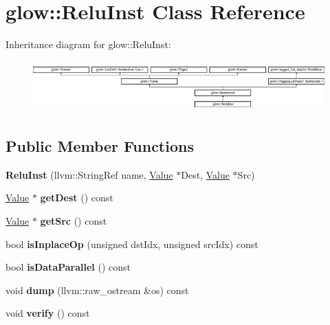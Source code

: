 \hypertarget{classglow_1_1_relu_inst}{}\section{glow\+:\+:Relu\+Inst Class Reference}
\label{classglow_1_1_relu_inst}
Inheritance diagram for glow\+:\+:Relu\+Inst\+:\begin{figure}[H]
\begin{center}
\leavevmode
\includegraphics[height=1.991111cm]{classglow_1_1_relu_inst}
\end{center}
\end{figure}
\subsection*{Public Member Functions}
\begin{DoxyCompactItemize}
\item 
\mbox{\label{classglow_1_1_relu_inst_a132f997170df14c4f7c8afc0d30849d3}} 
{\bfseries Relu\+Inst} (llvm\+::\+String\+Ref name, \hyperlink{classglow_1_1_value}{Value} $\ast$Dest, \hyperlink{classglow_1_1_value}{Value} $\ast$Src)
\item 
\mbox{\label{classglow_1_1_relu_inst_a1a2ffcc58c9225cda9f917df24f7f80f}} 
\hyperlink{classglow_1_1_value}{Value} $\ast$ {\bfseries get\+Dest} () const
\item 
\mbox{\label{classglow_1_1_relu_inst_a0531749e535cacbd049ed21b58392dc9}} 
\hyperlink{classglow_1_1_value}{Value} $\ast$ {\bfseries get\+Src} () const
\item 
\mbox{\label{classglow_1_1_relu_inst_a045d920a95f2e95e2a545e7fb5faecda}} 
bool {\bfseries is\+Inplace\+Op} (unsigned dst\+Idx, unsigned src\+Idx) const
\item 
\mbox{\label{classglow_1_1_relu_inst_a7c8d660ab4342f8a9c66078b93507a04}} 
bool {\bfseries is\+Data\+Parallel} () const
\item 
\mbox{\label{classglow_1_1_relu_inst_a991f3764fcd05b95302757fc37c3ce2f}} 
void {\bfseries dump} (llvm\+::raw\+\_\+ostream \&os) const
\item 
\mbox{\label{classglow_1_1_relu_inst_a89f0443a69baee50e9553b49d4d83bb1}} 
void {\bfseries verify} () const
\end{DoxyCompactItemize}
